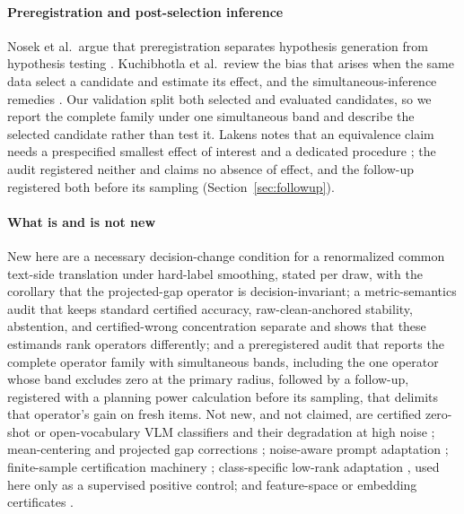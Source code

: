 \paragraph{Preregistration and post-selection inference}
Nosek et al.\ argue that preregistration separates hypothesis generation from hypothesis testing \cite{nosek2018preregistration}. Kuchibhotla et al.\ review the bias that arises when the same data select a candidate and estimate its effect, and the simultaneous-inference remedies \cite{kuchibhotla2022postselection}. Our validation split both selected and evaluated candidates, so we report the complete family under one simultaneous band and describe the selected candidate rather than test it. Lakens notes that an equivalence claim needs a prespecified smallest effect of interest and a dedicated procedure \cite{lakens2017equivalence}; the audit registered neither and claims no absence of effect, and the follow-up registered both before its sampling (Section~\ref{sec:followup}).

\paragraph{What is and is not new}
New here are a necessary decision-change condition for a renormalized common text-side translation under hard-label smoothing, stated per draw, with the corollary that the projected-gap operator is decision-invariant; a metric-semantics audit that keeps standard certified accuracy, raw-clean-anchored stability, abstention, and certified-wrong concentration separate and shows that these estimands rank operators differently; and a preregistered audit that reports the complete operator family with simultaneous bands, including the one operator whose band excludes zero at the primary radius, followed by a follow-up, registered with a planning power calculation before its sampling, that delimits that operator's gain on fresh items. Not new, and not claimed, are certified zero-shot or open-vocabulary VLM classifiers and their degradation at high noise \cite{nirala2024ovc}; mean-centering and projected gap corrections \cite{li2025closing,chowers2026bug}; noise-aware prompt adaptation \cite{hussein2024promptsmooth}; finite-sample certification machinery \cite{cohen2019smoothing}; class-specific low-rank adaptation \cite{hu2022lora}, used here only as a supervised positive control; and feature-space or embedding certificates \cite{xia2026feature,pautov2022smoothed}.
